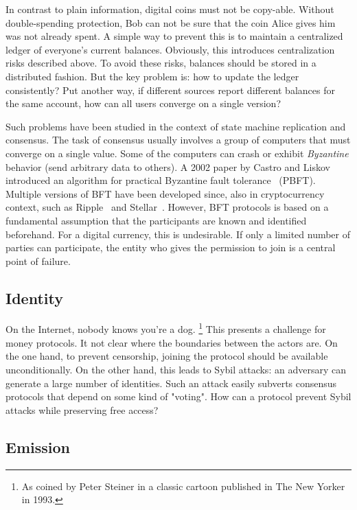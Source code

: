In contrast to plain information, digital coins must not be copy-able.
Without double-spending protection, Bob can not be sure that the coin Alice gives him was not already spent.
A simple way to prevent this is to maintain a centralized ledger of everyone's current balances.
Obviously, this introduces centralization risks described above.
To avoid these risks, balances should be stored in a distributed fashion.
But the key problem is: how to update the ledger consistently?
Put another way, if different sources report different balances for the same account, how can all users converge on a single version?

Such problems have been studied in the context of state machine replication and consensus.
The task of consensus usually involves a group of computers that must converge on a single value.
Some of the computers can crash or exhibit \textit{Byzantine} behavior (send arbitrary data to others).
A 2002 paper by Castro and Liskov introduced an algorithm for practical Byzantine fault tolerance~\cite{Castro2002} (PBFT).
Multiple versions of BFT have been developed since, also in cryptocurrency context, such as Ripple~\cite{Schwartz2014} and Stellar~\cite{Mazieres2014}.
However, BFT protocols is based on a fundamental assumption that the participants are known and identified beforehand.
For a digital currency, this is undesirable.
If only a limited number of parties can participate, the entity who gives the permission to join is a central point of failure.

\subsection{Identity}

On the Internet, nobody knows you're a dog.
\footnote{As coined by Peter Steiner in a classic cartoon published in The New Yorker in 1993.}
This presents a challenge for money protocols.
It not clear where the boundaries between the actors are.
On the one hand, to prevent censorship, joining the protocol should be available unconditionally.
On the other hand, this leads to Sybil attacks: an adversary can generate a large number of identities.
Such an attack easily subverts consensus protocols that depend on some kind of "voting".
How can a protocol prevent Sybil attacks while preserving free access?

\subsection{Emission}

